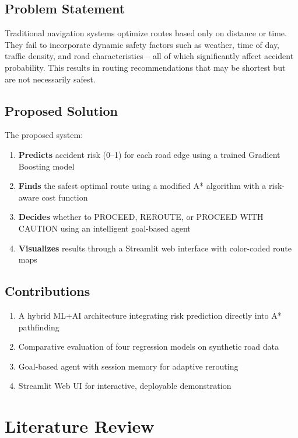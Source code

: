 \documentclass[12pt,a4paper]{report}
\begin{document}
\section{Problem Statement}
Traditional navigation systems optimize routes based only on distance or time. They fail to incorporate dynamic safety factors such as weather, time of day, traffic density, and road characteristics -- all of which significantly affect accident probability. This results in routing recommendations that may be shortest but are not necessarily safest.

\section{Proposed Solution}
The proposed system:
\begin{enumerate}
  \item \textbf{Predicts} accident risk (0--1) for each road edge using a trained Gradient Boosting model
  \item \textbf{Finds} the safest optimal route using a modified A* algorithm with a risk-aware cost function
  \item \textbf{Decides} whether to PROCEED, REROUTE, or PROCEED WITH CAUTION using an intelligent goal-based agent
  \item \textbf{Visualizes} results through a Streamlit web interface with color-coded route maps
\end{enumerate}

\section{Contributions}
\begin{enumerate}
  \item A hybrid ML+AI architecture integrating risk prediction directly into A* pathfinding
  \item Comparative evaluation of four regression models on synthetic road data
  \item Goal-based agent with session memory for adaptive rerouting
  \item Streamlit Web UI for interactive, deployable demonstration
\end{enumerate}

\chapter{Literature Review}
\end{document}

